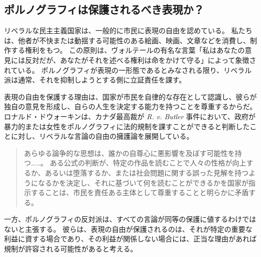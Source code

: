 \documentclass[paper=a4,book,openany]{jlreq}
\newcommand{\ig}[1]{}           %
\begin{document}
\subsection{ポルノグラフィは保護されるべき表現か？}

リベラルな民主主義国家は、一般的に市民に表現の自由を認めている。
私たちは、他者が不快または動揺する可能性のある絵画、映画、文章などを消費し、制作する権利をもつ。
この原則は、ヴォルテールの有名な言葉「私はあなたの意見には反対だが、あなたがそれを述べる権利は命をかけて守る」によって象徴されている。
ポルノグラフィが表現の一形態であるとみなされる限り、リベラル派は通常、それを抑制しようとする側に立証責任を課す。

表現の自由を保護する理由は、国家が市民を自律的な存在として認識し、彼らが独自の意見を形成し、自らの人生を決定する能力を持つことを尊重するからだ。
ロナルド・ドウォーキン\ig{Ronald Dworkin}は、カナダ最高裁が \emph{R. v. Butler} 事件において、政府が暴力的または女性をポルノグラフィに法的規制を課すことができると判断したことに対し、リベラルな言論の自由の擁護論を展開している。

\begin{quote}

あらゆる論争的な思想は、誰かの自尊心に悪影響を及ぼす可能性を持つ……。
ある公式の判断が、特定の作品を読むことで人々の性格が向上するか、あるいは堕落するか、または社会問題に関する誤った見解を持つようになるかを決定し、それに基づいて何を読むことができるかを国家が指示することは、市民を責任ある主体として尊重することと明らかに矛盾する。
\citep[pp.206--208]{dworkin96:_freed_law}

\end{quote}

一方、ポルノグラフィの反対派は、すべての言論が同等の保護に値するわけではないと主張する。
彼らは、表現の自由が保護されるのは、それが特定の重要な利益に資する場合であり、その利益が関係しない場合には、正当な理由があれば規制が許容される可能性があると考える。
\end{document}
